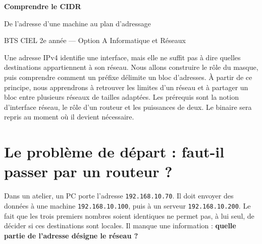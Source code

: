 \documentclass[11pt,a4paper]{article}
\newif\ifcorrige
\newcommand{\ip}[1]{\textcolor{ipred}{\texttt{#1}}}
\begin{document}
\begin{center}
{\LARGE\bfseries Comprendre le CIDR\par}
\smallskip
{\large De l'adresse d'une machine au plan d'adressage\par}
\medskip
BTS CIEL 2e année — Option A Informatique et Réseaux
\ifcorrige\par\textcolor{corr}{\textbf{Version enseignant — corrigés intégrés}}\fi
\end{center}

\begin{methode}
Une adresse IPv4 identifie une interface, mais elle ne suffit pas à dire quelles destinations
appartiennent à son réseau. Nous allons construire le rôle du masque, puis comprendre comment
un préfixe délimite un bloc d'adresses. À partir de ce principe, nous apprendrons à retrouver les
limites d'un réseau et à partager un bloc entre plusieurs réseaux de tailles adaptées.
Les prérequis sont la notion d'interface réseau, le rôle d'un routeur et les puissances de deux.
Le binaire sera repris au moment où il devient nécessaire.
\end{methode}

\Needspace{6cm}
\section{Le problème de départ : faut-il passer par un routeur ?}
Dans un atelier, un PC porte l'adresse \ip{192.168.10.70}. Il doit envoyer des données à une machine
\ip{192.168.10.100}, puis à un serveur \ip{192.168.10.200}. Le fait que les trois premiers nombres
soient identiques ne permet pas, à lui seul, de décider si ces destinations sont locales.
Il manque une information : \textbf{quelle partie de l'adresse désigne le réseau ?}

\begin{center}
\end{center}
\end{document}
